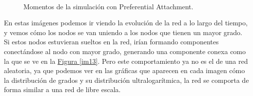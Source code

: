 \documentclass[paper=a4, fontsize=11pt]{article} %
\numberwithin{equation}{section} %
\numberwithin{figure}{section} %
\numberwithin{table}{section} %
\begin{document}
\begin{figure}[H]
    \centering
    \mbox{
    }
    \mbox{
        \qquad
    }
    \caption{Momentos de la simulación con Preferential Attachment.}
    \label{im_ej5}
\end{figure}

En estas imágenes podemos ir viendo la evolución de la red a lo largo del tiempo, y vemos cómo los nodos se van uniendo a los nodos que tienen un mayor grado. Si estos nodos estuvieran sueltos en la red, irían formando componentes conectándose al nodo con mayor grado, generando una componente conexa como la que se ve en la \hyperref[im13]{Figura \ref{im13}}. Pero este comportamiento ya no es el de una red aleatoria, ya que podemos ver en las gráficas que aparecen en cada imagen cómo la distribución de grados y su distribución ultralogarítmica, la red se comporta de forma similar a una red de libre escala.
\end{document}

